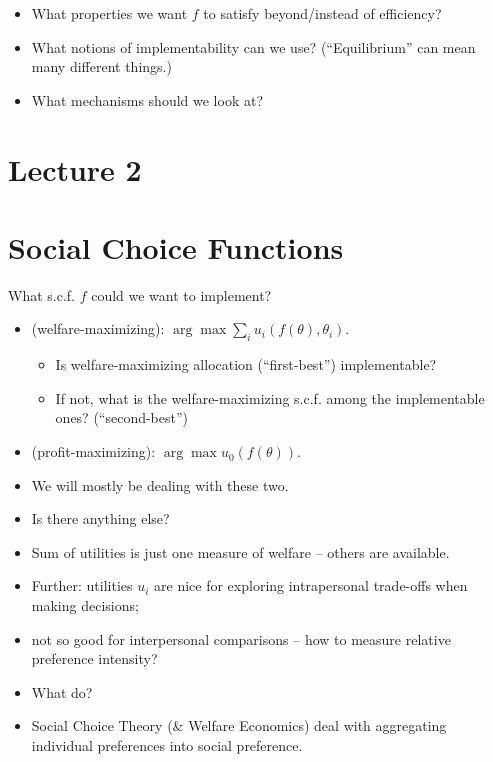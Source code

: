 \documentclass[english]{beamer}		%
\def\lyxframeend{} %
\begin{document}
\begin{itemize}
	\item What properties we want $f$ to satisfy beyond/instead of efficiency?
	\item What notions of implementability can we use? (``Equilibrium'' can mean many different things.)
	\item What mechanisms should we look at?
\end{itemize}
\lyxframeend





\section{Lecture 2}

\section{Social Choice Functions}


What s.c.f. $f$ could we want to implement?
\begin{itemize}
	\item {} (welfare-maximizing): $\arg \max \sum_i u_i(f(\theta),\theta_i)$.
	\begin{itemize}
		\item Is welfare-maximizing allocation (``first-best'') implementable?
		\item If not, what is the welfare-maximizing s.c.f. among the implementable ones? (``second-best'')
	\end{itemize}
	\pause
	\item {} (profit-maximizing): $\arg \max u_0(f(\theta))$.
	\pause
	\item We will mostly be dealing with these two.
	\item Is there anything else?
\end{itemize}
\lyxframeend


\begin{itemize}
	\item Sum of utilities is just one measure of welfare -- others are available.
	\item Further: utilities $u_i$ are nice for exploring intrapersonal trade-offs when making decisions;
	\item not so good for interpersonal comparisons -- how to measure relative preference intensity?
	\item What do?
	\pause
	\item Social Choice Theory (\& Welfare Economics) deal with aggregating individual preferences into social preference.
\end{itemize}
\lyxframeend
\end{document}
